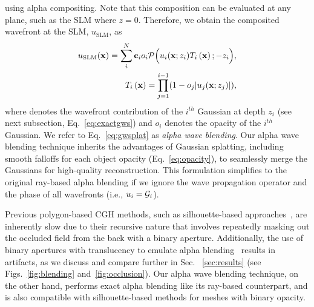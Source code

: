 %
using alpha compositing. Note that this composition can be evaluated at any plane, such as the SLM where $z=0$. Therefore, we obtain the composited  wavefront at the SLM, $u_{\textrm{SLM}}$, as  %
\begin{align}
    u_{\textrm{SLM}} (\mathbf{x}) = \sum_{i}^N \mathbf{c}_i o_i\mathcal{P}\Big(  u_i(\mathbf{x}; z_i)T_i\left(\mathbf{x}\right) ; -z_i\Big), \label{eq:gwsplat}\\
    T_i\left(\mathbf{x}\right) = \prod_{j=1}^{i-1} (1 - o_{j} |u_j(\mathbf{x}; z_j)|),
    \label{eq:gwsplat_T}
\end{align} 
where  denotes the wavefront contribution of the $i^{th}$ Gaussian at depth $z_i$ (see next subsection, Eq.~\ref{eq:exactgws}) and $o_i$ denotes the opacity of the $i^{th}$ Gaussian.  We refer to Eq.~\ref{eq:gwsplat} as \textit{alpha wave blending}. Our alpha wave blending technique inherits the advantages of Gaussian splatting, including smooth falloffs for each object opacity (Eq.~\ref{eq:opacity}), to seamlessly merge the Gaussians for high-quality reconstruction. This formulation simplifies to the original ray-based alpha blending if we ignore the wave propagation operator and the phase of all wavefronts (i.e., $u_i=\mathcal{G}_i$). %

Previous polygon-based CGH methods, such as silhouette-based approaches~\cite{matsushima2014silhouette}, are inherently slow due to their recursive nature that involves repeatedly masking out the occluded field from the back with a binary aperture. Additionally, the use of binary apertures with translucency to emulate alpha blending~\cite{matsushima2020introduction} results in artifacts, as we discuss and compare further in Sec. ~\ref{sec:results} (see Figs.~\ref{fig:blending} and~\ref{fig:occlusion}). Our alpha wave blending technique, on the other hand, performs exact alpha blending like its ray-based counterpart, and is also compatible with silhouette-based methods for meshes with binary opacity. 

